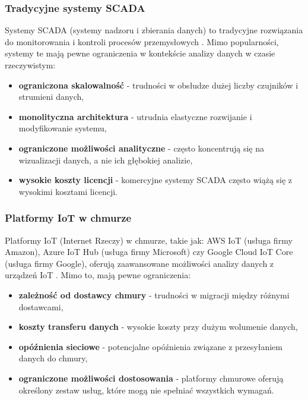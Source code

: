 \subsubsection{Tradycyjne systemy SCADA}
\label{subsubsec:scada}

Systemy SCADA (systemy nadzoru i zbierania danych) to tradycyjne rozwiązania do monitorowania i kontroli procesów przemysłowych \cite{scada}.
Mimo popularności, systemy te mają pewne ograniczenia w kontekście analizy danych w czasie rzeczywistym:

\begin{itemize}
    \item \textbf{ograniczona skalowalność} - trudności w obsłudze dużej liczby czujników i strumieni danych,
    \item \textbf{monolityczna architektura} - utrudnia elastyczne rozwijanie i modyfikowanie systemu,
    \item \textbf{ograniczone możliwości analityczne} - często koncentrują się na wizualizacji danych, a nie ich głębokiej analizie,
    \item \textbf{wysokie koszty licencji} - komercyjne systemy SCADA często wiążą się z wysokimi kosztami licencji.
\end{itemize}

\subsubsection{Platformy IoT w chmurze}
\label{subsubsec:cloud_iot}

Platformy IoT (Internet Rzeczy) w chmurze, takie jak: AWS IoT (usługa firmy Amazon), Azure IoT Hub (usługa firmy Microsoft) czy Google Cloud IoT Core (usługa firmy Google), oferują zaawansowane możliwości analizy danych z
urządzeń IoT \cite{cloud_iot}. Mimo to, mają pewne ograniczenia:

\begin{itemize}
    \item \textbf{zależność od dostawcy chmury} - trudności w migracji między różnymi dostawcami,
    \item \textbf{koszty transferu danych} - wysokie koszty przy dużym wolumenie danych,
    \item \textbf{opóźnienia sieciowe} - potencjalne opóźnienia związane z przesyłaniem danych do chmury,
    \item \textbf{ograniczone możliwości dostosowania} - platformy chmurowe oferują określony zestaw usług, które mogą nie spełniać wszystkich wymagań.
\end{itemize}

